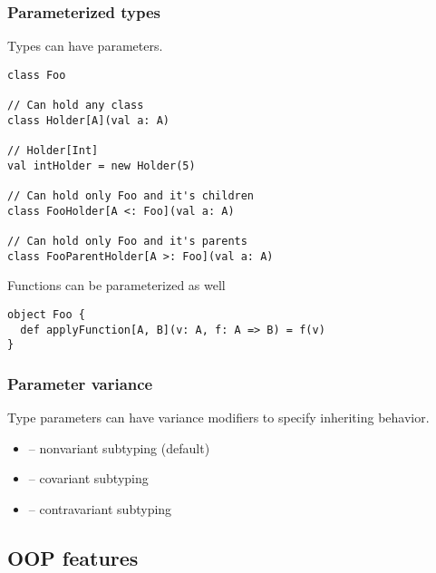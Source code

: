 \begin{frame}[fragile]
\frametitle{Parameterized types}

Types can have parameters.

\begin{lstlisting}
class Foo

// Can hold any class
class Holder[A](val a: A)

// Holder[Int]
val intHolder = new Holder(5)

// Can hold only Foo and it's children
class FooHolder[A <: Foo](val a: A)

// Can hold only Foo and it's parents
class FooParentHolder[A >: Foo](val a: A)
\end{lstlisting}

Functions can be parameterized as well

\begin{lstlisting}
object Foo {
  def applyFunction[A, B](v: A, f: A => B) = f(v)
}
\end{lstlisting}

\end{frame}

\begin{frame}[fragile]
\frametitle{Parameter variance}
Type parameters can have variance modifiers to specify inheriting behavior.
\begin{itemize}
\item {} -- nonvariant subtyping (default)
\item {} -- covariant subtyping
\item {} -- contravariant subtyping
\end{itemize}

\end{frame}

\subsection{OOP features}

